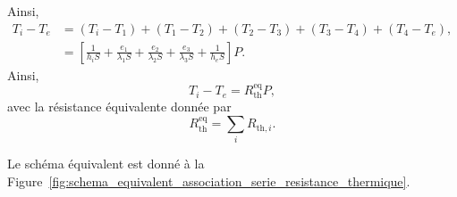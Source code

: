         Ainsi,
        \begin{align}
            T_i-T_e
            &=
            (T_i-T_1)+(T_1-T_2)+(T_2-T_3)+(T_3-T_4)+(T_4-T_e),\\
            &=\left[
                \frac{1}{h_i S}+\frac{e_1}{\lambda_1 S}+\frac{e_2}{\lambda_2 S}+\frac{e_3}{\lambda_3 S}+\frac{1}{h_e S}
            \right]P.
        \end{align}
        Ainsi,
        \begin{equation}
            T_i-T_e=R_{\text{th}}^{\text{eq}}P,
        \end{equation}
        avec la résistance équivalente donnée par
        \begin{equation}
            \boxed{
                R_{\text{th}}^{\text{eq}}=\sum_{i}R_{\text{th},i}.
            }
        \end{equation}

        Le schéma équivalent est donné à la Figure~\ref{fig:schema_equivalent_association_serie_resistance_thermique}.

